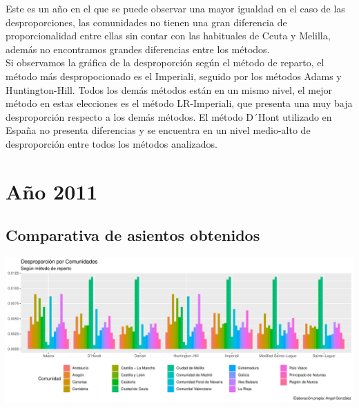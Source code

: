 \documentclass[12pt,a4paper,]{book}
\numberwithin{dummy}{section}
\theoremstyle{ocrenumbox}
\theoremstyle{blacknumex}
\theoremstyle{blacknumbox}
\theoremstyle{ocrenum}
\theoremstyle{ocrenum}
\begin{document}
Este es un año en el que se puede observar una mayor igualdad en el caso
de las desproporciones, las comunidades no tienen una gran diferencia de
proporcionalidad entre ellas sin contar con las habituales de Ceuta y
Melilla, además no encontramos grandes diferencias entre los métodos.\\
Si observamos la gráfica de la desproporción según el método de reparto,
el método más despropocionado es el Imperiali, seguido por los métodos
Adams y Huntington-Hill. Todos los demás métodos están en un mismo
nivel, el mejor método en estas elecciones es el método LR-Imperiali,
que presenta una muy baja desproporción respecto a los demás métodos. El
método D´Hont utilizado en España no presenta diferencias y se encuentra
en un nivel medio-alto de desproporción entre todos los métodos
analizados.

\hypertarget{auxf1o-2011}{%
\section{Año 2011}\label{auxf1o-2011}}

\hypertarget{comparativa-de-asientos-obtenidos-10}{%
\subsection{Comparativa de asientos
obtenidos}\label{comparativa-de-asientos-obtenidos-10}}

\begin{center}\includegraphics[width=1\linewidth]{figurasR/unnamed-chunk-108-1} \end{center}
\end{document}
